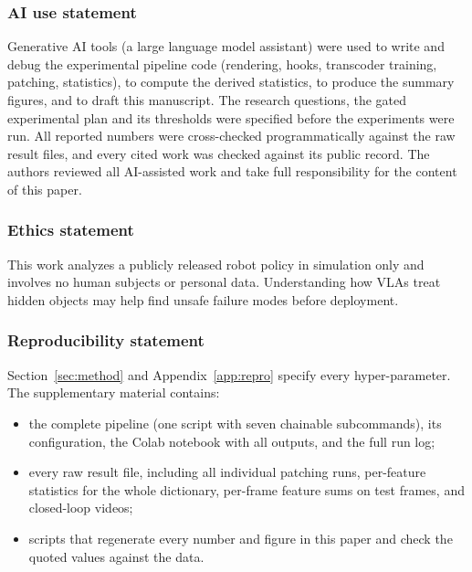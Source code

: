 \documentclass{article} %
\begin{document}
\subsubsection*{AI use statement}
Generative AI tools (a large language model assistant) were used to write and debug the experimental pipeline code (rendering, hooks, transcoder training, patching, statistics), to compute the derived statistics, to produce the summary figures, and to draft this manuscript. The research questions, the gated experimental plan and its thresholds were specified before the experiments were run. All reported numbers were cross-checked programmatically against the raw result files, and every cited work was checked against its public record. The authors reviewed all AI-assisted work and take full responsibility for the content of this paper.

\subsubsection*{Ethics statement}
This work analyzes a publicly released robot policy in simulation only and involves no human subjects or personal data. Understanding how VLAs treat hidden objects may help find unsafe failure modes before deployment.

\subsubsection*{Reproducibility statement}
Section~\ref{sec:method} and Appendix~\ref{app:repro} specify every hyper-parameter. The supplementary material contains:
\begin{itemize}[leftmargin=*,itemsep=0pt,topsep=1pt]
  \item the complete pipeline (one script with seven chainable subcommands), its configuration, the Colab notebook with all outputs, and the full run log;
  \item every raw result file, including all individual patching runs, per-feature statistics for the whole dictionary, per-frame feature sums on test frames, and closed-loop videos;
  \item scripts that regenerate every number and figure in this paper and check the quoted values against the data.
\end{itemize}



\end{document}
